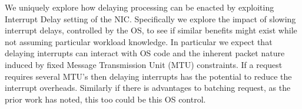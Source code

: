 We uniquely explore how delaying processing can be enacted by exploiting Interrupt Delay setting of the NIC. Specifically we explore the impact of slowing interrupt delays, controlled by the OS, to see if similar benefits might exist while not assuming particular workload knowledge.  In particular we expect that delaying interrupts can interact with OS code and the inherent packet nature induced by fixed Message Transmission Unit (MTU) constraints. If a request requires several MTU's then delaying interrupts has the potential to reduce the interrupt overheads. Similarly if there is advantages to batching request, as the prior work has noted, this too could be this OS control.



 
